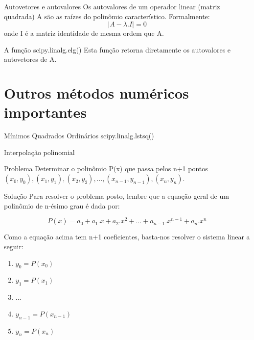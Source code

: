\documentclass{beamer}
\begin{document}
	\begin{frame}{Autovetores e autovalores}
		Os autovalores de um operador linear (matriz quadrada) A são as raízes do polinômio característico.  Formalmente:
		\begin{equation*}
			|A - \lambda.I| = 0
		\end{equation*}
		onde I é a matriz identidade de mesma ordem que A.
		
		\begin{block}{A função scipy.linalg.elg()}
			Esta função retorna diretamente os autovalores e autovetores de A.
		\end{block}
		
	\end{frame}
	
		\section{Outros métodos numéricos importantes}
	
	\begin{frame}{Mínimos Quadrados Ordinários}
		scipy.linalg.lstsq()
	\end{frame}
	

	
	\begin{frame}{Interpolação polinomial}
		\begin{block}{Problema}
			Determinar o polinômio P(x) que passa pelos n+1 pontos $(x_0,y_0), (x_1,y_1), (x_2,y_2), ..., (x_{n-1},y_{n-1}), (x_n,y_n)$.
		\end{block}
	\end{frame}
	
	\begin{frame}{Solução}
		Para resolver o problema posto, lembre que a equação geral de um polinômio de n-ésimo grau é dada por:
		
		\begin{equation*}
		P(x)=a_0 + a_1 . x + a_2 . x^2 + ... + a_{n-1} . x^{n-1} + a_n . x^n
		\end{equation*}
		
		Como a equação acima tem  n+1 coeficientes, basta-nos  resolver o sistema linear a seguir:
		
		\begin{enumerate}
			\item $y_0 = P(x_0)$
			\item $y_1 = P(x_1)$
			\item ...
			\item $y_{n-1} = P(x_{n-1})$
			\item $y_n = P(x_n)$
		\end{enumerate}
	\end{frame}
	
\end{document}
